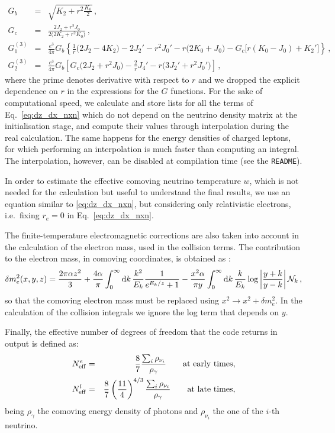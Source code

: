 \documentclass[notitlepage,showpacs,preprintnumbers,amsmath,amssymb,superscriptaddress,prd,onecolumn]{revtex4-1}
\newcommand{\Neff}{\ensuremath{N_{\rm eff}}}
\begin{document}
%
\begin{eqnarray}
G_b
&=&
\sqrt{K_2 + r^2 \frac{K_0}{2}}
\,,\\
G_c
&=&
\frac{2J_2 + r^2 J_0}{2\Big(2K_2 + r^2 K_0\Big)}
\,,\\
G_1^{(3)}
&=&
\frac{e^3}{4\pi} G_b
\left\{
 \frac{1}{r}\Big(2J_2-4K_2\Big)
 -2J_2'
 -r^2J_0'
 -r\Big(2K_0+J_0\Big)
 -G_c\Big[r(K_0-J_0)+K_2'\Big]
\right\}
\,,\\
G_2^{(3)}
&=&
\frac{e^3}{4\pi} G_b
\left[
 G_c \Big(2J_2 + r^2 J_0\Big)
 -\frac{2}{r}J_4'
 -r\Big(3J_2'+r^2J_0'\Big)
\right]
\,,
\label{eq:g3}
\end{eqnarray}
%
where the prime denotes derivative with respect to $r$ and we dropped the explicit dependence on $r$ in the expressions for the $G$ functions.
For the sake of computational speed, we calculate and store lists for all the terms of Eq.~\eqref{eq:dz_dx_nxn}
which do not depend on the neutrino density matrix 
at the initialisation stage, and compute their values through interpolation during the real calculation.
The same happens for the energy densities of charged leptons, for which performing an interpolation
is much faster than computing an integral.
The interpolation, however, can be disabled at compilation time (see the \texttt{README}).

In order to estimate the effective comoving neutrino temperature $w$, which is
not needed for the calculation but useful to understand the final results,
we use an equation similar to \eqref{eq:dz_dx_nxn},
but considering only relativistic electrons, i.e.\ fixing $r_e=0$ in Eq.~\eqref{eq:dz_dx_nxn}.

The finite-temperature electromagnetic corrections are also taken into account in the calculation
of the electron mass, used in the collision terms.
The contribution to the electron mass, in comoving coordinates, is obtained as \cite{Fornengo:1997wa,Mangano:2001iu,...}:
\begin{equation}
\delta m_e^2(x, y, z)
=
\frac{2\pi\alpha z^2}{3}
+
\frac{4\alpha}{\pi}
\int_0^\infty{\rm d}k\,
\frac{k^2}{E_k}
\frac{1}{e^{E_k/z}+1}
-
\frac{x^2\alpha}{\pi y}
\int_0^\infty{\rm d}k\,
\frac{k}{E_k}
\log\left|\frac{y+k}{y-k}\right|
\mathcal{N}_k
\,,
\end{equation}
so that the comoving electron mass must be replaced using $x^2\rightarrow x^2+\delta m_e^2$.
In the calculation of the collision integrals we ignore the log term that depends on $y$.

Finally, the effective number of degrees of freedom that the code returns in output is defined as:
\begin{eqnarray}
\Neff^e
&=&
\frac{8}{7}
\frac{\sum_i \rho_{\nu_i}}{\rho_\gamma}
\qquad\text{at early times,}
\\
\Neff^l
&=&
\frac{8}{7}
\left(\frac{11}{4}\right)^{4/3}
\frac{\sum_i \rho_{\nu_i}}{\rho_\gamma}
\qquad\text{at late times,}
\end{eqnarray}
being $\rho_\gamma$ the comoving energy density of photons and
$\rho_{\nu_i}$ the one of the $i$-th neutrino.
\end{document}
